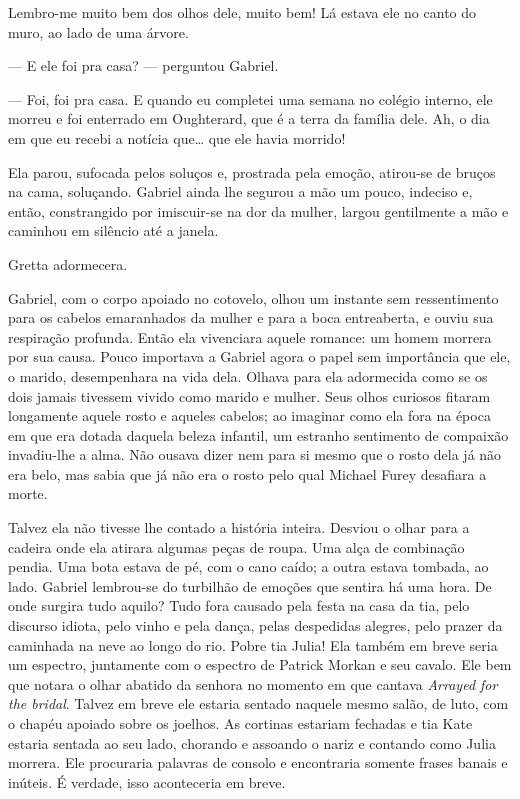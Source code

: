 Lembro-me muito bem dos olhos dele, muito bem! Lá estava ele no canto
do muro, ao lado de uma árvore.

--- E ele foi pra casa? --- perguntou Gabriel.

--- Foi, foi pra casa. E quando eu completei uma semana no colégio
interno, ele morreu e foi enterrado em Oughterard, que é a terra da
família dele. Ah, o dia em que eu recebi a notícia que\ldots{} que ele
havia morrido!

Ela parou, sufocada pelos soluços e, prostrada pela emoção, atirou-se
de bruços na cama, soluçando. Gabriel ainda lhe segurou a mão um
pouco, indeciso e, então, constrangido por imiscuir-se na dor da
mulher, largou gentilmente a mão e caminhou em silêncio até a janela.

\dotfill\hspace{.7\textwidth}

Gretta adormecera.

Gabriel, com o corpo apoiado no cotovelo, olhou um instante sem
ressentimento para os cabelos emaranhados da mulher e para a boca
entreaberta, e ouviu sua respiração profunda. Então ela vivenciara
aquele romance: um homem morrera por sua causa. Pouco importava a
Gabriel agora o papel sem importância que ele, o marido, desempenhara
na vida dela. Olhava para ela adormecida como se os dois jamais
tivessem vivido como marido e mulher. Seus olhos curiosos fitaram
longamente aquele rosto e aqueles cabelos; ao imaginar como ela fora
na época em que era dotada daquela beleza infantil, um estranho
sentimento de compaixão invadiu-lhe a alma. Não ousava dizer nem
para si mesmo que o rosto dela já não era belo, mas sabia que já não
era o rosto pelo qual Michael Furey desafiara a morte.

Talvez ela não tivesse lhe contado a história inteira. Desviou o olhar
para a cadeira onde ela atirara algumas peças de roupa. Uma alça de
combinação pendia. Uma bota estava de pé, com o cano caído; a outra
estava tombada, ao lado. Gabriel lembrou-se do turbilhão de emoções
que sentira há uma hora. De onde surgira tudo aquilo? Tudo fora
causado pela festa na casa da tia, pelo discurso idiota, pelo vinho e
pela dança, pelas despedidas alegres, pelo prazer da caminhada na neve
ao longo do rio. Pobre tia Julia! Ela também em breve seria um
espectro, juntamente com o espectro de Patrick Morkan e seu cavalo.
Ele bem que notara o olhar
abatido da senhora no momento em que cantava \textit{Arrayed for the bridal}.
Talvez em breve ele estaria sentado naquele mesmo salão, de luto, com
o chapéu apoiado sobre os joelhos. As cortinas estariam fechadas e tia
Kate estaria sentada ao seu lado, chorando e assoando o nariz e
contando como Julia morrera. Ele procuraria palavras de consolo e
encontraria somente frases banais e inúteis. É verdade, isso
aconteceria em breve.

